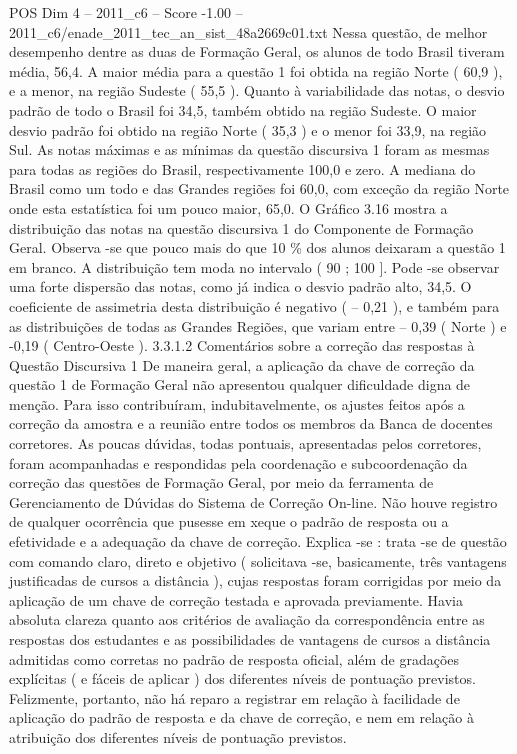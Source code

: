 \begin{textsample}{POS Dim 4 – 2011\_c6 – Score -1.00 – 2011\_c6/enade\_2011\_tec\_an\_sist\_48a2669c01.txt}
Nessa questão, de melhor desempenho dentre as duas de Formação Geral, os alunos de todo Brasil tiveram média, 56,4.
A maior média para a questão 1 foi obtida na região Norte ( 60,9 ), e a menor, na região Sudeste ( 55,5 ).
Quanto à variabilidade das notas, o desvio padrão de todo o Brasil foi 34,5, também obtido na região Sudeste.
O maior desvio padrão foi obtido na região Norte ( 35,3 ) e o menor foi 33,9, na região Sul.
As notas máximas e as mínimas da questão discursiva 1 foram as mesmas para todas as regiões do Brasil, respectivamente 100,0 e zero.
A mediana do Brasil como um todo e das Grandes regiões foi 60,0, com exceção da região Norte onde esta estatística foi um pouco maior, 65,0.
O Gráfico 3.16 mostra a distribuição das notas na questão discursiva 1 do Componente de Formação Geral.
Observa -se que pouco mais do que 10 \% dos alunos deixaram a questão 1 em branco.
A distribuição tem moda no intervalo ( 90 ; 100 ].
Pode -se observar uma forte dispersão das notas, como já indica o desvio padrão alto, 34,5.
O coeficiente de assimetria desta distribuição é negativo ( – 0,21 ), e também para as distribuições de todas as Grandes Regiões, que variam entre – 0,39 ( Norte ) e -0,19 ( Centro-Oeste ). 3.3.1.2 Comentários sobre a correção das respostas à Questão Discursiva 1 De maneira geral, a aplicação da chave de correção da questão 1 de Formação Geral não apresentou qualquer dificuldade digna de menção.
Para isso contribuíram, indubitavelmente, os ajustes feitos após a correção da amostra e a reunião entre todos os membros da Banca de docentes corretores.
As poucas dúvidas, todas pontuais, apresentadas pelos corretores, foram acompanhadas e respondidas pela coordenação e subcoordenação da correção das questões de Formação Geral, por meio da ferramenta de Gerenciamento de Dúvidas do Sistema de Correção On-line.
Não houve registro de qualquer ocorrência que pusesse em xeque o padrão de resposta ou a efetividade e a adequação da chave de correção.
Explica -se : trata -se de questão com comando claro, direto e objetivo ( solicitava -se, basicamente, três vantagens justificadas de cursos a distância ), cujas respostas foram corrigidas por meio da aplicação de um chave de correção testada e aprovada previamente.
Havia absoluta clareza quanto aos critérios de avaliação da correspondência entre as respostas dos estudantes e as possibilidades de vantagens de cursos a distância admitidas como corretas no padrão de resposta oficial, além de gradações explícitas ( e fáceis de aplicar ) dos diferentes níveis de pontuação previstos.
Felizmente, portanto, não há reparo a registrar em relação à facilidade de aplicação do padrão de resposta e da chave de correção, e nem em relação à atribuição dos diferentes níveis de pontuação previstos.

\end{textsample}
